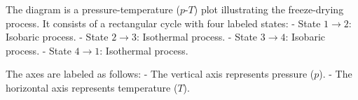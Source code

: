 The diagram is a pressure-temperature (\(p\)-\(T\)) plot illustrating the freeze-drying process. It consists of a rectangular cycle with four labeled states:  
- State \(1 \to 2\): Isobaric process.  
- State \(2 \to 3\): Isothermal process.  
- State \(3 \to 4\): Isobaric process.  
- State \(4 \to 1\): Isothermal process.  

The axes are labeled as follows:  
- The vertical axis represents pressure (\(p\)).  
- The horizontal axis represents temperature (\(T\)).